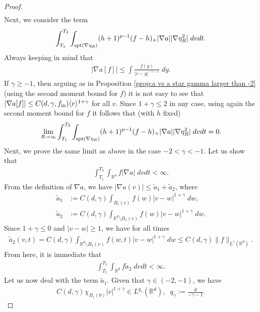 \documentclass[12pt,american]{amsart}
\numberwithin{equation}{section}
\theoremstyle{plain}
\theoremstyle{definition}                  %
\def\fin{f_{\textnormal{in}}}
\begin{document}
\begin{proof}
\begin{align*}
  \end{align*}
  Next, we consider the term
  \begin{align*}
    \int_{T_1}^{T_3} \int_{\textnormal{spt}(\nabla \eta_R)} (h+1)^{p-1}(f-h)_+|\nabla a||\nabla \eta_R^2|\;dvdt.
  \end{align*}
  Always keeping in mind that
  \begin{align*}
    |\nabla a[f] | \le \int \frac{f(y)}{|v-y|^{-\gamma-1}}\;dy.
  \end{align*}
  If $\gamma \geq -1$, then arguing as in Proposition \ref{prop:a vs a star gamma larger than -2} (using the second moment bound for $f$) it is not easy to see that $|\nabla a[f]|\leq C(d,\gamma,\fin) \langle v\rangle^{1+\gamma}$ for all $v$. Since $1+\gamma\leq 2$ in any case, using again the second moment bound for $f$  it follows that (with $h$ fixed)
  \begin{align*}
    \lim \limits_{R \to \infty}\int_{T_1}^{T_3} \int_{\textnormal{spt}(\nabla \eta_R)}(h+1)^{p-1}(f-h)_+|\nabla a||\nabla \eta_R^2|\;dvdt = 0.
  \end{align*}
  Next, we prove the same limit as above in the case $-2 <\gamma<-1$. Let us show that
  \begin{align*}
    \int_{T_1}^{T_3}\int_{\mathbb{R}^d}f|\nabla a| \;dvdt<\infty.
  \end{align*}
  From the definition of $\nabla a$, we have $|\nabla a(v)| \leq \tilde a_1+\tilde a_2$, where
  \begin{align*}
    \tilde a_1 & := C(d,\gamma)\int_{B_1(v)}f(w)|v-w|^{1+\gamma}\;dw,\\
    \tilde a_2 & := C(d,\gamma)\int_{\mathbb{R}^d\setminus B_1(v)}f(w)|v-w|^{1+\gamma}\;dw.
  \end{align*}
  Since $1+\gamma\leq 0$ and $|v-w|\geq 1$, we have for all times
  \begin{align*}
    \tilde a_2(v,t) = C(d,\gamma)\int_{\mathbb{R}^d\setminus B_1(v)}f(w,t)|v-w|^{1+\gamma}\;dw \leq C(d,\gamma)\|f\|_{L^1(\mathbb{R}^d)}. 
  \end{align*}	  
  From here, it is immediate that
  \begin{align*}
    \int_{T_1}^{T_3}\int_{\mathbb{R}^d}f \tilde a_2 \;dvdt<\infty.
  \end{align*}
  Let us now deal with the term $\tilde a_1$. Given that $\gamma \in (-2,-1)$, we have
  \begin{align*}
    C(d,\gamma)\chi_{B_1(0)}|v|^{1+\gamma} \in L^{q_\gamma}(\mathbb{R}^d),\;\; q_\gamma := \frac{d}{-\gamma-1}    . 
  \end{align*}

\end{proof}
\end{document}
